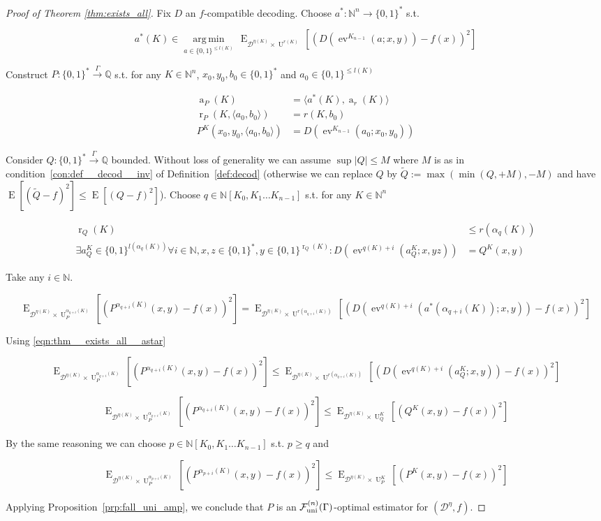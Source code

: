 \documentclass{article}
\numberwithin{equation}{section}
\theoremstyle{definition}
\theoremstyle{plain}
\newcommand{\Bool}{\{0,1\}}
\newcommand{\Words}{{\Bool^*}}
\DeclareMathOperator{\E}{E}
\DeclareMathOperator{\Ev}{ev}
\DeclareMathOperator{\R}{r}
\DeclareMathOperator{\A}{a}
\DeclareMathOperator{\Un}{U}
\newcommand{\Argmin}[1]{\underset{#1}{\operatorname{arg\,min}}\,}
\newcommand{\Nats}{\mathbb{N}}
\newcommand{\Rats}{\mathbb{Q}}
\newcommand{\NatPoly}{\Nats[K_0, K_1 \ldots K_{n-1}]}
\newcommand{\Abs}[1]{\lvert #1 \rvert}
\newcommand{\Chev}[1]{\langle #1 \rangle}
\newcommand{\Dist}{\mathcal{D}}
\newcommand{\Fall}{\mathcal{F}}
\newcommand{\BoolR}[1]{\Bool^{\R_{#1}(K)}}
\newcommand{\FallU}{{\Fall_{\textnormal{uni}}^{(n)}}}
\newcommand{\Scheme}{\xrightarrow{\Gamma}}
\begin{document}
\begin{proof}[Proof of Theorem \ref{thm:exists_all}]

Fix ${D}$ an ${f}$-compatible decoding. Choose ${a^*: \Nats^n \rightarrow \Words}$ s.t.

\begin{equation}
\label{eqn:thm__exists_all__astar}
a^*(K) \in \Argmin{a \in \Bool^{\leq l(K)}} \E_{\Dist^{\eta(K)} \times \Un^{r(K)}}[(D(\Ev^{K_{n-1}}(a;x,y))-f(x))^2]
\end{equation} 

Construct ${P: \Words \Scheme \Rats}$ s.t. for any ${K \in \Nats^n}$, ${x_0,y_0,b_0 \in \Words}$ and ${a_0 \in \Bool^{\leq l(K)}}$

\begin{align}
\A_P(K) &= \Chev{a^*(K),\A_r(K)}\\
\R_P(K,\Chev{a_0,b_0}) &= r(K,b_0) \\
P^K(x_0,y_0,\Chev{a_0,b_0}) &= D(\Ev^{K_{n-1}}(a_0;x_0,y_0))
\end{align}

Consider ${Q: \Words \Scheme \Rats}$ bounded. Without loss of generality we can assume ${\sup \Abs{Q} \leq M}$ where ${M}$ is as in condition~\ref{con:def__decod__inv} of Definition~\ref{def:decod} (otherwise we can replace ${Q}$ by ${\tilde{Q}:=\max(\min(Q,+M),-M)}$ and have ${\E[(\tilde{Q}-f)^2]\leq\E[(Q-f)^2]}$). Choose ${q \in \NatPoly}$ s.t. for any ${K \in \Nats^n}$

\begin{align}
\label{eqn:thm__exists_all__q_rnd}\R_Q(K) &\leq r(\alpha_q(K)) \\
\label{eqn:thm__exists_all__q_adv}\exists a_Q^K \in \Bool^{l(\alpha_q(K))} \forall i \in \Nats, x,z \in \Words, y \in \BoolR{Q}: D(\Ev^{q(K)+i}(a_Q^K;x,yz))&=Q^K(x,y)
\end{align}

Take any ${i \in \Nats}$.

\[\E_{ \Dist^{\eta(K)} \times \Un_P^{\alpha_{q+i}(K)}}[(P^{\alpha_{q+i}(K)}(x,y)-f(x))^2]=\E_{ \Dist^{\eta(K)} \times \Un^{r(\alpha_{q+i}(K))}}[(D(\Ev^{q(K)+i}(a^*(\alpha_{q+i}(K));x,y))-f(x))^2]\]

Using \ref{eqn:thm__exists_all__astar}

\[\E_{ \Dist^{\eta(K)} \times \Un_P^{\alpha_{q+i}(K)}}[(P^{\alpha_{q+i}(K)}(x,y)-f(x))^2] \leq \E_{\Dist^{\eta(K)} \times \Un^{r(\alpha_{q+i}(K))}}[(D(\Ev^{q(K)+i}(a_Q^K;x,y))-f(x))^2]\]

\[\E_{ \Dist^{\eta(K)} \times \Un_P^{\alpha_{q+i}(K)}}[(P^{\alpha_{q+i}(K)}(x,y)-f(x))^2] \leq \E_{\Dist^{\eta(K)} \times \Un_Q^K}[(Q^K(x,y)-f(x))^2]\]

By the same reasoning we can choose ${p \in \NatPoly}$ s.t. ${p \geq q}$ and

\[\E_{ \Dist^{\eta(K)} \times \Un_P^{\alpha_{p+i}(K)}}[(P^{\alpha_{p+i}(K)}(x,y)-f(x))^2] \leq \E_{\Dist^{\eta(K)} \times \Un_P^K}[(P^K(x,y)-f(x))^2]\]

Applying Proposition~\ref{prp:fall_uni_amp}, we conclude that ${P}$ is an ${\FallU(\Gamma)}$-optimal estimator for ${(\Dist^\eta,f)}$.
%
\end{proof}
\end{document}

